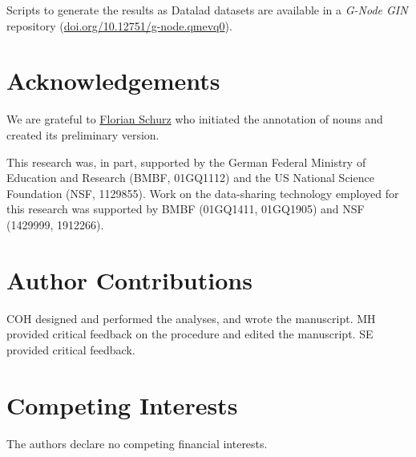 \documentclass[english,11pt]{article}
\begin{document}
Scripts to generate the results as Datalad \citep{datalad} datasets are
available in a \emph{G-Node GIN} repository
(\href{https://doi.org/10.12751/g-node.qmevq0}{\url{doi.org/10.12751/g-node.qmevq0}}\citep{haeusler2021ppa}).



{\small
}


%
%


\section*{Acknowledgements}


We are grateful to \href{www.florianschurz.de}{Florian Schurz} who initiated the
annotation of nouns and created its preliminary version.%

This research was, in part, supported by the German Federal Ministry of
Education and Research (BMBF, 01GQ1112) and the US National Science Foundation
(NSF, 1129855). Work on the data-sharing technology employed for this research
was supported by BMBF (01GQ1411, 01GQ1905) and NSF (1429999, 1912266).


\section*{Author Contributions}

COH designed and performed the analyses, and wrote the manuscript.
%
MH provided critical feedback on the procedure and edited the manuscript.
%
SE provided critical feedback.


\section*{Competing Interests}

The authors declare no competing financial interests.
\end{document}
